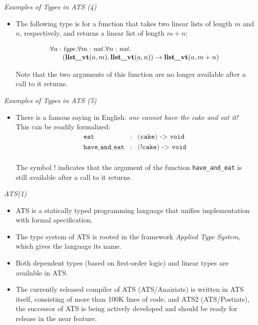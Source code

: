 \documentclass[pdf]{prosper}
\def\snat{{\it nat}}
\def\stype{{\it type}}
\def\tllist{\mbox{\bf list\_vt}}
\def\timp{\rightarrow}
\begin{document}
\begin{slide}{\em Examples of Types in ATS (4)}
\begin{itemize}
\item

The following type is for a function that takes two linear lists of length
$m$ and $n$, respectively, and returns a linear list of length $m+n$:

$$\begin{array}{l}
\forall a:\stype.\forall m:\snat.\forall n:\snat.~\\
\kern18pt(\tllist(a, m), \tllist(a, n)) \timp \tllist(a, m+n)\\
\end{array}$$

Note that the two arguments of this function are no longer available
after a call to it returns.

\end{itemize}
\end{slide}
\begin{slide}{\em Examples of Types in ATS (5)}
\begin{itemize}
\item

There is a famous saying in English: {\em one cannot have the cake and
eat it!} This can be readily formalized:
$$\begin{array}{rcl}
\texttt{eat} & : & \texttt{(cake) -> void} \\
\texttt{have\_and\_eat} & : & \texttt{(!cake) -> void} \\
\end{array}$$

The symbol $!$ indicates that the argument of the function
\texttt{have\_and\_eat} is still available after a call to it returns.

\end{itemize}
\end{slide}
\begin{slide}{\em ATS(1)}
\begin{itemize}

\item
ATS is a statically typed programming language that unifies implementation
with formal specification.

\item
The type system of ATS is rooted in the framework {\em Applied Type System},
which gives the language its name.

\item
Both dependent types (based on first-order logic) and linear types are
available in ATS.

\item
The currently released compiler of ATS (ATS/Anairiats) is written in ATS
itself, consisting of more than 100K lines of code, and ATS2
(ATS/Postiats), the successor of ATS is being actively developed and should
be ready for release in the near feature.

\end{itemize}
\end{slide}
\end{document}

